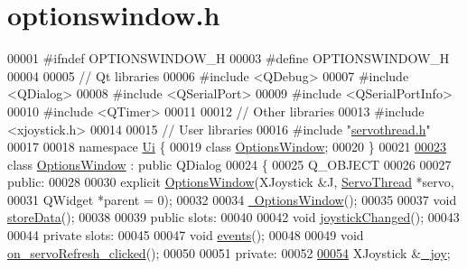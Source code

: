 \hypertarget{optionswindow_8h_source}{}\section{optionswindow.\+h}

\begin{DoxyCode}
00001 \textcolor{preprocessor}{#ifndef OPTIONSWINDOW\_H}
00003 \textcolor{preprocessor}{#define OPTIONSWINDOW\_H}
00004 
00005 \textcolor{comment}{// Qt libraries}
00006 \textcolor{preprocessor}{#include <QDebug>}
00007 \textcolor{preprocessor}{#include <QDialog>}
00008 \textcolor{preprocessor}{#include <QSerialPort>}
00009 \textcolor{preprocessor}{#include <QSerialPortInfo>}
00010 \textcolor{preprocessor}{#include <QTimer>}
00011 
00012 \textcolor{comment}{// Other libraries}
00013 \textcolor{preprocessor}{#include <xjoystick.h>}
00014 
00015 \textcolor{comment}{// User libraries}
00016 \textcolor{preprocessor}{#include "\hyperlink{servothread_8h}{servothread.h}"}
00017 
00018 \textcolor{keyword}{namespace }\hyperlink{namespace_ui}{Ui} \{
00019 \textcolor{keyword}{class }\hyperlink{class_options_window}{OptionsWindow};
00020 \}
00021 
\hypertarget{optionswindow_8h_source_l00023}{}\hyperlink{class_options_window}{00023} \textcolor{keyword}{class }\hyperlink{class_options_window}{OptionsWindow} : \textcolor{keyword}{public} QDialog
00024 \{
00025     Q\_OBJECT
00026     
00027 \textcolor{keyword}{public}:
00028     
00030     \textcolor{keyword}{explicit} \hyperlink{class_options_window_ae8e0a610d13a0478bdac57ec7cd4afba}{OptionsWindow}(XJoystick &J, \hyperlink{class_servo_thread}{ServoThread} *servo, 
00031                            QWidget *parent = 0);
00032     
00034     \hyperlink{class_options_window_a034c885fe8bb4416e732a9571d14a6b4}{~OptionsWindow}();
00035     
00037     \textcolor{keywordtype}{void} \hyperlink{class_options_window_ab0a56ad7347c20046602a7a2a1c83397}{storeData}();
00038     
00039 \textcolor{keyword}{public} slots:
00040     
00042     \textcolor{keywordtype}{void} \hyperlink{class_options_window_ae8c0373be58da710194f8d14f1c3c4dc}{joystickChanged}();
00043 
00044 \textcolor{keyword}{private} slots:
00045     
00047     \textcolor{keywordtype}{void} \hyperlink{class_options_window_a18763ff318688083c7ee5a21f22e8e98}{events}();
00048     
00049     \textcolor{keywordtype}{void} \hyperlink{class_options_window_ad5365d452e8bcd86cbb64b9ec42c3b7e}{on\_servoRefresh\_clicked}();
00050     
00051 \textcolor{keyword}{private}:
00052     
\hypertarget{optionswindow_8h_source_l00054}{}\hyperlink{class_options_window_a1bf846ab681ab245f70adac30999947c}{00054}     XJoystick &\hyperlink{class_options_window_a1bf846ab681ab245f70adac30999947c}{\_joy};

\end{DoxyCode}
